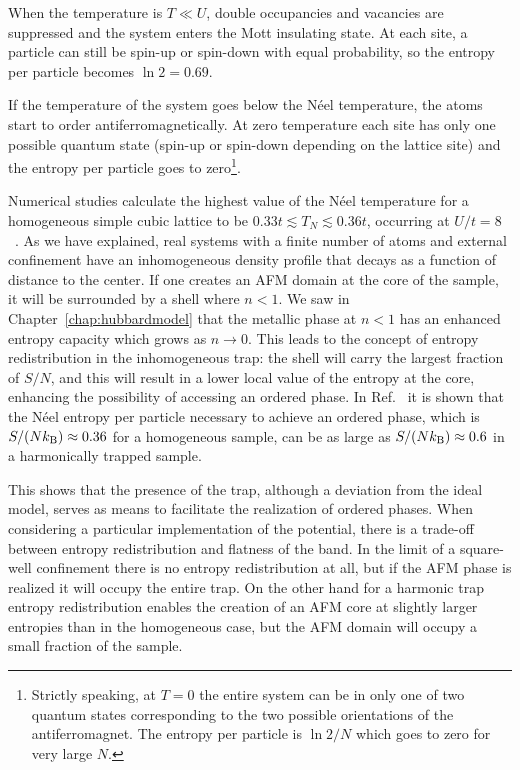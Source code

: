 When the temperature is $T\ll U$, double occupancies and vacancies are suppressed
and the system enters the Mott insulating state.  At each site, a
particle can still  be spin-up or spin-down with equal probability, so the
entropy per particle becomes $\ln 2 = 0.69 $.   

If the temperature of the system goes below the N\'{e}el temperature, the atoms
start to order antiferromagnetically.  At zero temperature each site has only
one possible quantum state (spin-up or spin-down depending on the lattice site)
and the entropy per particle goes to zero\footnote{Strictly speaking, at $T=0$
the entire system can be in only one of two quantum states corresponding to the
two possible orientations of the antiferromagnet. The entropy per particle is
$\ln2/N$ which goes to zero for very large $N$.}.  

Numerical studies calculate the highest value of the N\'{e}el temperature for a
homogeneous simple cubic lattice to be $0.33t \lesssim T_{N} \lesssim 0.36t$,
occurring at $U/t=8$~\cite{Fuchs2011,Paiva2011,Kozic2013}.   As we have
explained, real systems with a finite number of atoms and external confinement
have an inhomogeneous density profile that decays as a function of distance to
the center.  If one creates an AFM domain at the core of the sample, it will be
surrounded by a shell where $n<1$.   We saw in Chapter~\ref{chap:hubbardmodel}
that the metallic phase at $n<1$ has an enhanced entropy capacity which grows
as $n\rightarrow 0$.  This leads to the concept of entropy redistribution in
the inhomogeneous trap:  the shell will carry the largest fraction of $S/N$,
and this will result in a lower local value of the entropy at the core,
enhancing the possibility of accessing an ordered phase.   In
Ref.~\cite{Paiva2011} it is shown that the N\'{e}el entropy per particle
necessary to achieve an ordered phase, which is $S/(Nk_{\mathrm{B}}) \approx 0.36$ for a
homogeneous sample, can be as large as $S/(Nk_{\mathrm{B}}) \approx 0.6$ in a harmonically
trapped sample. 

This shows that the presence of the trap, although a deviation from the ideal
model, serves as means to facilitate the realization of ordered phases.   When
considering a particular implementation of the potential, there is a trade-off
between entropy redistribution and flatness of the band.  In the limit of a
square-well confinement there is no entropy redistribution at all, but if
the AFM phase is realized it will occupy the entire trap.   On the other hand
for a harmonic trap entropy redistribution enables the creation of an AFM core
at slightly larger entropies than in the homogeneous case, but the AFM domain
will occupy a small fraction of the sample.  


